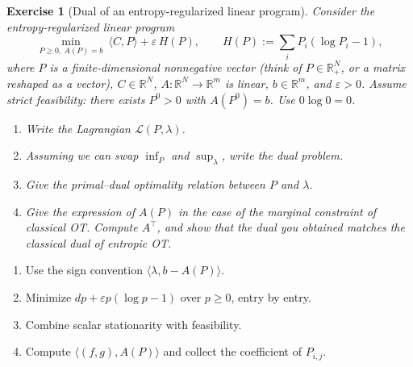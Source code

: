 \documentclass[11pt,a4paper]{article}
\theoremstyle{exostyle}
\newtheorem{exercise}{Exercise}
\newcommand{\R}{\mathbb{R}}
\newcommand{\ip}[2]{\langle #1,#2\rangle}
\begin{document}
\begin{exercise}[Dual of an entropy-regularized linear program]\label{ex:entropic-LP-dual}
Consider the entropy-regularized linear program
\[
\min_{P\ge 0,\ A(P)=b} \ \ip{C}{P} + \varepsilon\,H(P),
\qquad
H(P) := \sum_{i} P_i(\log P_i - 1),
\]
where $P$ is a finite-dimensional nonnegative vector (think of $P\in\R^N_+$, or a matrix reshaped as a vector), $C\in\R^N$, $A:\R^N\to\R^m$ is linear, $b\in\R^m$, and $\varepsilon>0$. Assume strict feasibility: there exists $P^0>0$ with $A(P^0)=b$. Use $0\log0=0$.

\begin{enumerate}[label=\textbf{(\arabic*)}]
  \item Write the Lagrangian $\mathcal L(P,\lambda)$.
  \item Assuming we can swap $\inf_P$ and $\sup_\lambda$, write the dual problem.
  \item Give the primal--dual optimality relation between $P$ and $\lambda$.
  \item Give the expression of $A(P)$ in the case of the marginal constraint of classical OT.
    Compute $A^\top$, and show that the dual you obtained matches the classical dual of entropic OT.
\end{enumerate}
\end{exercise}
\begin{hints}
\begin{enumerate}[label=(\arabic*)]\item Use the sign convention $\langle\lambda,b-A(P)\rangle$.\item Minimize $dp+\varepsilon p(\log p-1)$ over $p\ge0$, entry by entry.\item Combine scalar stationarity with feasibility.\item Compute $\langle(f,g),A(P)\rangle$ and collect the coefficient of $P_{i,j}$.\end{enumerate}
\end{hints}
\end{document}
